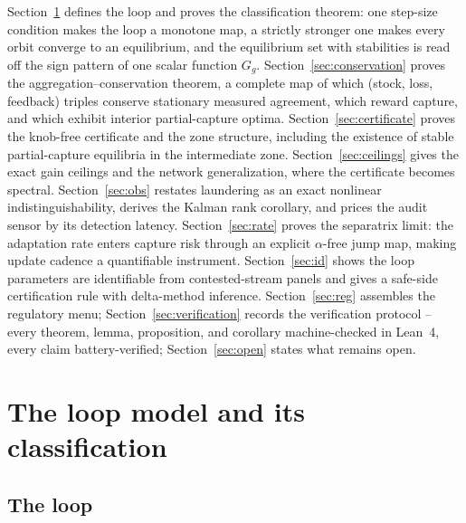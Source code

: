 \documentclass[11pt]{article}
\theoremstyle{definition}
\theoremstyle{remark}
\numberwithin{equation}{section}
\begin{document}
Section~\ref{sec:model} defines the loop and proves the classification theorem: one step-size condition makes the loop a monotone map, a strictly stronger one makes every orbit converge to an equilibrium, and the equilibrium set with stabilities is read off the sign pattern of one scalar function $G_g$. Section~\ref{sec:conservation} proves the aggregation--conservation theorem, a complete map of which (stock, loss, feedback) triples conserve stationary measured agreement, which reward capture, and which exhibit interior partial-capture optima. Section~\ref{sec:certificate} proves the knob-free certificate and the zone structure, including the existence of stable partial-capture equilibria in the intermediate zone. Section~\ref{sec:ceilings} gives the exact gain ceilings and the network generalization, where the certificate becomes spectral. Section~\ref{sec:obs} restates laundering as an exact nonlinear indistinguishability, derives the Kalman rank corollary, and prices the audit sensor by its detection latency. Section~\ref{sec:rate} proves the separatrix limit: the adaptation rate enters capture risk through an explicit $\alpha$-free jump map, making update cadence a quantifiable instrument. Section~\ref{sec:id} shows the loop parameters are identifiable from contested-stream panels and gives a safe-side certification rule with delta-method inference. Section~\ref{sec:reg} assembles the regulatory menu; Section~\ref{sec:verification} records the verification protocol -- every theorem, lemma, proposition, and corollary machine-checked in Lean~4, every claim battery-verified; Section~\ref{sec:open} states what remains open.

\section{The loop model and its classification}\label{sec:model}

\subsection{The loop}
\end{document}

